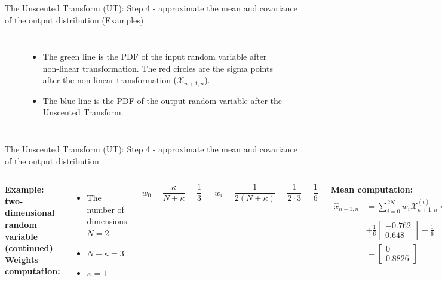 \begin{frame}{The Unscented Transform (UT): Step 4 - approximate the mean and covariance of the output
distribution (Examples)}
\begin{columns}
\begin{figure}
    \begin{itemize}
        \item The green line is the PDF of the input random variable after non-linear transformation. The red circles are the sigma points after the non-linear transformation ($\mathcal{X}_{n+1,n}$).
        \item The blue line is the PDF of the output random variable after the Unscented Transform.
    \end{itemize}
\end{figure}
\end{columns}
\end{frame}


\begin{frame}{The Unscented Transform (UT): Step 4 - approximate the mean and covariance of the output distribution}
\begin{columns}
\textbf{Example: two-dimensional random variable  (continued)}
\textbf{Weights computation:}
\begin{itemize}
    \item The number of dimensions: \(N = 2\)
    \item \(N + \kappa = 3\)
    \item \(\kappa = 1\)
\end{itemize}

\[
w_0 = \frac{\kappa}{N + \kappa} = \frac{1}{3}
\]

\[
w_i = \frac{1}{2(N + \kappa)} = \frac{1}{2 \cdot 3} = \frac{1}{6}
\]

\textbf{Mean computation:}
\begin{align*}
\hat{x}_{n+1,n} & = \sum_{i=0}^{2N} w_i \mathcal{X}^{(i)}_{n+1,n} = \frac{1}{3}
\begin{bmatrix}
0 \\
1
\end{bmatrix}
+ \frac{1}{6}
\begin{bmatrix}
0 \\
1.0866
\end{bmatrix} \\
& + \frac{1}{6}
\begin{bmatrix}
-0.762 \\
0.648
\end{bmatrix}
+ \frac{1}{6}
\begin{bmatrix}
0 \\
0.913
\end{bmatrix}
+ \frac{1}{6}
\begin{bmatrix}
0.762 \\
0.648
\end{bmatrix} \\
& =
\begin{bmatrix}
0 \\
0.8826
\end{bmatrix}    
\end{align*}


\end{columns}
\end{frame}
